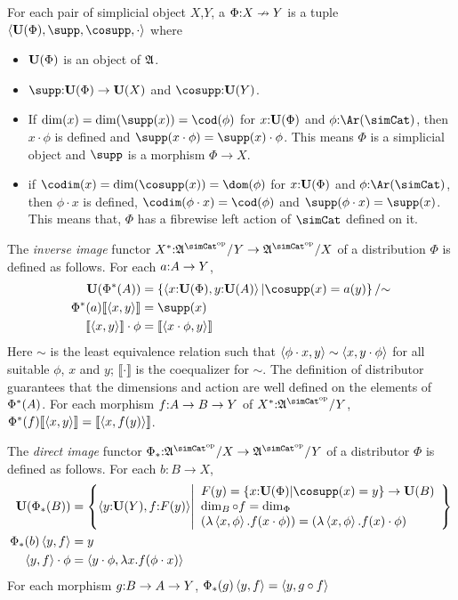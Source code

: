 \documentclass[csh.tex]{subfiles}
\begin{document}
\newcommand\ecof[1]{\llbracket #1 \rrbracket}
\begin{definition} For each pair of simplicial object $X$,$Y$, a  $\Phi\mathord : X\nrightarrow Y$ is a tuple 
$\tuplet{\base(\Phi),\supp,\cosupp,\cdot}$ where 
\begin{itemize}
\item $\mathbf{U}(\Phi)$ is an object of $\mathfrak A$.
\item $\supp\of\base(\Phi)\to\base(X)$ and $\cosupp\of\base(Y)$.
\item If $\dim(x) = \dim(\supp(x)) = \cod(\phi)$ for $x\mathord :\mathbf{U}(\Phi)$ and $\phi\of\Ar(\simCat)$, then $x\cdot \phi$ is defined and $\supp(x\cdot \phi) = \supp(x)\cdot \phi$. This means $\Phi$ is a simplicial object and $\supp$ is a morphism $\Phi\to X$.
\item if $\codim(x) = \dim(\cosupp(x)) = \dom(\phi)$ for $x\mathord :\mathbf{U}(\Phi)$ and $\phi\of\Ar(\simCat)$, then $\phi\cdot x$ is defined, $\codim(\phi\cdot x) = \cod(\phi)$ and $\supp(\phi\cdot x) = \supp(x)$. This means that, $\Phi$ has a fibrewise left action of $\simCat$ defined on it.
\end{itemize}

The \emph{inverse image} functor $X\ri\of\ambient\s/Y\to\ambient\s/X$ of a distribution $\Phi$ is defined as follows. 
For each $a\mathord : A\to Y$,
\begin{align*}
\base(\Phi\ri(A)) &= \set{\tuplet{x\of\base(\Phi),y\of\base(A)} | \cosupp(x) = a(y) }/\mathord\sim\\
\Phi\ri(a)\ecof{\tuplet{x,y}} &= \supp(x)\\
\ecof{\tuplet{x,y}}\cdot\phi &= \ecof{\tuplet{x\cdot\phi,y}} \\
\end{align*}
Here $\sim$ is the least equivalence relation such that $\left\langle \phi\cdot x,y \right\rangle\sim\left\langle x,y\cdot\phi \right\rangle$ for all suitable $\phi$, $x$ and $y$; $\ecof{\cdot}$ is the coequalizer for $\sim$. The definition of distributor guarantees that the dimensions and action are well defined on the elements of $\Phi^*(A)$.
For each morphism $f\mathord : A\to B \to Y$ of $X\ri\of\ambient\s/Y$, $\Phi\ri(f)\ecof{\tuplet{x,y}} = \ecof{\tuplet{x,f(y)}}$.

The \emph{direct image} functor $\Phi_*\of\ambient\s/X\to\ambient\s/Y$ of a distributor $\Phi$ is defined as follows. For each $b:B\to X$,
\begin{align*}
\base(\Phi_*(B)) &= \set{ \tuplet{y\of\base(Y),f\of F(y)}  \middle| 
\begin{array}{l}
F(y) = \set{x\of \base(\Phi)|\cosupp(x) = y}\to \base(B)\\
\dim_B\circ f = \dim_\Phi\\
(\function{\tuplet{x,\phi}}{f(x\cdot\phi)}) = (\function{\tuplet{x,\phi}}{f(x)\cdot\phi}) 
\end{array}
}\\
\Phi_*(b)\tuplet{y,f} &= y\\
\tuplet{y,f}\cdot \phi &= \tuplet{y\cdot \phi,\function x f(\phi\cdot x)}
\end{align*}
For each morphism $g\mathord : B\to A\to Y$, $\Phi_*(g)\left\langle y,f \right\rangle = \left\langle y,g\circ f \right\rangle$
\end{definition}
\end{document}

